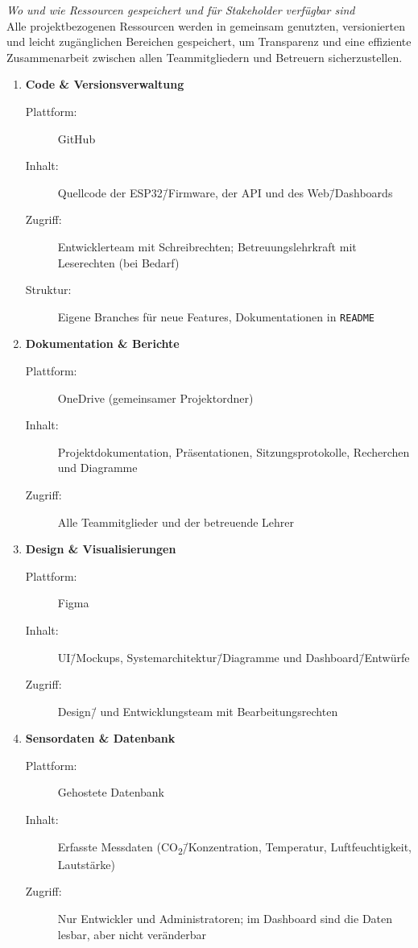\documentclass{article}
\begin{document}
\noindent\textit{Wo und wie Ressourcen gespeichert und für Stakeholder verfügbar sind}\\
Alle projektbezogenen Ressourcen werden in gemeinsam genutzten, versionierten und leicht zugänglichen Bereichen gespeichert, um Transparenz und eine effiziente Zusammenarbeit zwischen allen Teammitgliedern und Betreuern sicherzustellen.

\begin{enumerate}[left=1.5em,label=\arabic*.]
  \item \textbf{Code \& Versionsverwaltung}
  \begin{description}
    \item[Plattform:] GitHub
    \item[Inhalt:] Quellcode der ESP32\=/Firmware, der API und des Web\=/Dashboards
    \item[Zugriff:] Entwicklerteam mit Schreibrechten; Betreuungslehrkraft mit Leserechten (bei Bedarf)
    \item[Struktur:] Eigene Branches für neue Features, Dokumentationen in \texttt{README}
  \end{description}

  \item \textbf{Dokumentation \& Berichte}
  \begin{description}
    \item[Plattform:] OneDrive (gemeinsamer Projektordner)
    \item[Inhalt:] Projektdokumentation, Präsentationen, Sitzungsprotokolle, Recherchen und Diagramme
    \item[Zugriff:] Alle Teammitglieder und der betreuende Lehrer
  \end{description}

  \item \textbf{Design \& Visualisierungen}
  \begin{description}
    \item[Plattform:] Figma
    \item[Inhalt:] UI\=/Mockups, Systemarchitektur\=/Diagramme und Dashboard\=/Entwürfe
    \item[Zugriff:] Design\=/ und Entwicklungsteam mit Bearbeitungsrechten
  \end{description}

  \item \textbf{Sensordaten \& Datenbank}
  \begin{description}
    \item[Plattform:] Gehostete Datenbank
    \item[Inhalt:] Erfasste Messdaten (CO\textsubscript{2}\=/Konzentration, Temperatur, Luftfeuchtigkeit, Lautstärke)
    \item[Zugriff:] Nur Entwickler und Administratoren; im Dashboard sind die Daten lesbar, aber nicht veränderbar
  \end{description}


\end{enumerate}
\end{document}
